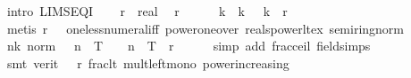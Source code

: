 \begin{isabellebody}
%
\isadelimproof
%
\endisadelimproof
%
\isatagproof
{}\isamarkupfalse%
\ {\isacharparenleft}{\kern0pt}intro\ LIMSEQ{\isacharunderscore}{\kern0pt}I{\isacharparenright}{\kern0pt}\isanewline
\ \ \isamarkupfalse%
\ r\ {\isacharcolon}{\kern0pt}{\isacharcolon}{\kern0pt}\ real\ \isamarkupfalse%
\ {\isachardoublequoteopen}r\ {\isachargreater}{\kern0pt}\ {}{\isachardoublequoteclose}\isanewline
\ \ \isamarkupfalse%
\ k\ \ k{\isacharcolon}{\kern0pt}\ {\isachardoublequoteopen}{}\ {\isacharslash}{\kern0pt}\ {}{\isacharcircum}{\kern0pt}k\ {\isacharless}{\kern0pt}\ r{\isachardoublequoteclose}\isanewline
\ \ \ \ \isamarkupfalse%
\ {\isacharparenleft}{\kern0pt}metis\ {\isacartoucheopen}r\ {\isachargreater}{\kern0pt}\ {}{\isacartoucheclose}\ one{\isacharunderscore}{\kern0pt}less{\isacharunderscore}{\kern0pt}numeral{\isacharunderscore}{\kern0pt}iff\ power{\isacharunderscore}{\kern0pt}one{\isacharunderscore}{\kern0pt}over\ reals{\isacharunderscore}{\kern0pt}power{\isacharunderscore}{\kern0pt}lt{\isacharunderscore}{\kern0pt}ex\ semiring{\isacharunderscore}{\kern0pt}norm{\isacharparenleft}{\kern0pt}{}{}{\isacharparenright}{\kern0pt}{\isacharparenright}{\kern0pt}\isanewline
\ \ \isamarkupfalse%
\ \isamarkupfalse%
\ {\isachardoublequoteopen}{\isasymforall}n{\isasymge}k{\isachardot}{\kern0pt}\ norm\ {\isacharparenleft}{\kern0pt}{\isasymlceil}{}\ {\isacharcircum}{\kern0pt}\ n\ {\isacharasterisk}{\kern0pt}\ T{\isasymrceil}\ {\isacharslash}{\kern0pt}\ {}\ {\isacharcircum}{\kern0pt}\ n\ {\isacharminus}{\kern0pt}\ T{\isacharparenright}{\kern0pt}\ {\isacharless}{\kern0pt}\ r{\isachardoublequoteclose}\isanewline
\ \ \ \ \isamarkupfalse%
\ {\isacharparenleft}{\kern0pt}simp\ add{\isacharcolon}{\kern0pt}\ frac{\isacharunderscore}{\kern0pt}ceil\ field{\isacharunderscore}{\kern0pt}simps{\isacharparenright}{\kern0pt}\isanewline
\ \ \ \ \isamarkupfalse%
\ {\isacharparenleft}{\kern0pt}smt\ {\isacharparenleft}{\kern0pt}verit{\isacharparenright}{\kern0pt}\ {\isacartoucheopen}{}\ {\isacharless}{\kern0pt}\ r{\isacartoucheclose}\ frac{\isacharunderscore}{\kern0pt}lt{\isacharunderscore}{\kern0pt}{}\ mult{\isacharunderscore}{\kern0pt}left{\isacharunderscore}{\kern0pt}mono\ power{\isacharunderscore}{\kern0pt}increasing{\isacharparenright}{\kern0pt}\isanewline
\ \ \isamarkupfalse%
\ \isamarkupfalse%

\end{isabellebody}

